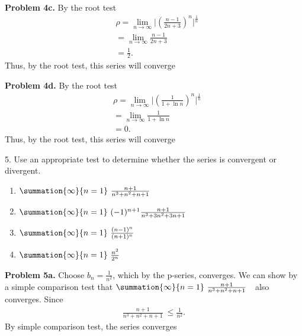 \documentclass{report}
\begin{document}
    \pagebreak \bigbreak \noindent 
    \textbf{Problem 4c.} By the root test
    \begin{align*}
        &\rho = \lim\limits_{n \to \infty}{\bigg\lvert \left(\frac{n-1}{2n+3}\right)^{n} \bigg\rvert^{\frac{1}{n}}} \\
        &=\lim\limits_{n \to \infty}{\frac{n-1}{2n+3}} \\
        &=\frac{1}{2}
    .\end{align*}
    \bigbreak \noindent 
    Thus, by the root test, this series will converge

    \bigbreak \noindent 
    \textbf{Problem 4d.} By the root test
    \begin{align*}
        &\rho = \lim\limits_{n \to \infty}{\bigg\lvert\left(\frac{1}{1+\ln{n}}\right)^{n}\bigg\rvert^{\frac{1}{n}}} \\
        &=\lim\limits_{n \to \infty}{\frac{1}{1+\ln{n}}} \\
        &=0
    .\end{align*}
    \bigbreak \noindent 
    Thus, by the root test, this series will converge
    
    \pagebreak \bigbreak \noindent 
    \begin{mdframed}
        5. Use an appropriate test to determine whether the series is convergent or divergent.
            \begin{enumerate}[label=(\alph*)]
                \item $ \summation{\infty}{n=1}\ \frac{n+1}{n^{3}+n^{2} +n+1}\  $
                \item $ \summation{\infty}{n=1}\ (-1)^{n+1}\frac{n+1}{n^{3} + 3n^{2}  + 3n + 1}\  $
                \item $ \summation{\infty}{n=1}\ \frac{(n-1)^{n}}{(n+1)^{n}}\  $
                \item $ \summation{\infty}{n=1}\ \frac{n^{2}}{2^{n}}\  $
            \end{enumerate}
    \end{mdframed}

    \bigbreak \noindent 
    \textbf{Problem 5a.} Choose $b_{n} = \frac{1}{n^{2}} $, which by the p-series, converges. We can show by a simple comparison test that $\summation{\infty}{n=1}\ \frac{n+1}{n^{3}+n^{2} +n+1}\ \  $ also converges. Since 
    \begin{align*}
        \frac{n+1}{n^{3}+n^{2} +n+1}\ \leq \frac{1}{n^{2}}
    .\end{align*}
    \bigbreak \noindent 
    By simple comparison test, the series converges
\end{document}
